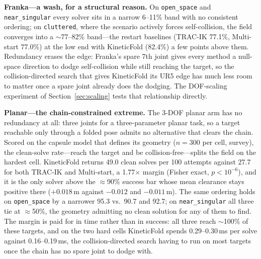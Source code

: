\documentclass[10pt,conference]{IEEEtran}
\begin{document}
% 

\textbf{Franka---a wash, for a structural reason.} On \texttt{open\_space} and
\texttt{near\_singular} every solver sits in a narrow 6--11\% band with no
consistent ordering; on \texttt{cluttered}, where the scenario actively forces
self-collision, the field converges into a $\sim$77--82\% band---the restart
baselines (TRAC-IK 77.1\%, Multi-start 77.0\%) at the low end with KineticFold
(82.4\%) a few points above them. Redundancy erases the edge: Franka's spare 7th
joint gives every method a null-space direction to dodge self-collision while
still reaching the target, so the collision-directed search that gives
KineticFold its UR5 edge has much less room to matter once a spare joint already
does the dodging. The DOF-scaling experiment of Section~\ref{sec:scaling} tests
that relationship directly.

\textbf{Planar---the chain-constrained extreme.} The 3-DOF planar arm has no
redundancy at all: three joints for a three-parameter planar task, so a target
reachable only through a folded pose admits no alternative that clears the chain.
Scored on the capsule model that defines its geometry ($n = 300$ per cell,
survey), the clean-solve rate---reach the target and be collision-free---splits
the field on the hardest cell. KineticFold returns 49.0 clean solves per 100
attempts against 27.7 for both TRAC-IK and Multi-start, a 1.77$\times$ margin
(Fisher exact, $p < 10^{-6}$), and it is the only solver above the
$\approx$90\% success bar whose mean clearance stays positive there
($+0.018$\,m against $-0.012$ and $-0.011$\,m). The same ordering holds on
\texttt{open\_space} by a narrower 95.3 vs.\ 90.7 and 92.7; on
\texttt{near\_singular} all three tie at $\approx$50\%, the geometry admitting no
clean solution for any of them to find. The margin is paid for in time rather
than in success: all three reach $\sim$100\% of these targets, and on the two
hard cells KineticFold spends 0.29--0.30\,ms per solve against 0.16--0.19\,ms,
the collision-directed search having to run on most targets once the chain has no
spare joint to dodge with.
\end{document}

